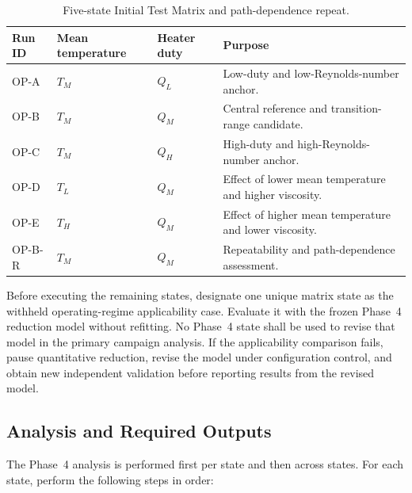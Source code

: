 \documentclass[11pt]{article}
\begin{document}
\begin{table}[htbp]
    \centering
    \caption{Five-state Initial Test Matrix and path-dependence repeat.}
    \label{tab:matrix5}
    \begin{tabularx}{\textwidth}{
        @{}
        >{\raggedright\arraybackslash}p{0.90in}
        >{\raggedright\arraybackslash}p{1.35in}
        >{\raggedright\arraybackslash}p{1.25in}
        >{\raggedright\arraybackslash}X
        @{}
    }
        \toprule
        \textbf{Run ID} &
        \textbf{Mean temperature} &
        \textbf{Heater duty} &
        \textbf{Purpose} \\
        \midrule

        OP-A & $T_M$ & $Q_L$ & Low-duty and low-Reynolds-number anchor. \\
        OP-B & $T_M$ & $Q_M$ & Central reference and transition-range candidate. \\
        OP-C & $T_M$ & $Q_H$ & High-duty and high-Reynolds-number anchor. \\
        OP-D & $T_L$ & $Q_M$ & Effect of lower mean temperature and higher viscosity. \\
        OP-E & $T_H$ & $Q_M$ & Effect of higher mean temperature and lower viscosity. \\
        OP-B-R & $T_M$ & $Q_M$ & Repeatability and path-dependence assessment. \\

        \bottomrule
    \end{tabularx}
\end{table}

Before executing the remaining states, designate one unique matrix state as the withheld operating-regime applicability case. Evaluate it with the frozen Phase~4 reduction model without refitting. No Phase~4 state shall be used to revise that model in the primary campaign analysis. If the applicability comparison fails, pause quantitative reduction, revise the model under configuration control, and obtain new independent validation before reporting results from the revised model.

\subsection{Analysis and Required Outputs}

The Phase~4 analysis is performed first per state and then across states. For each state, perform the following steps in order:
\end{document}
